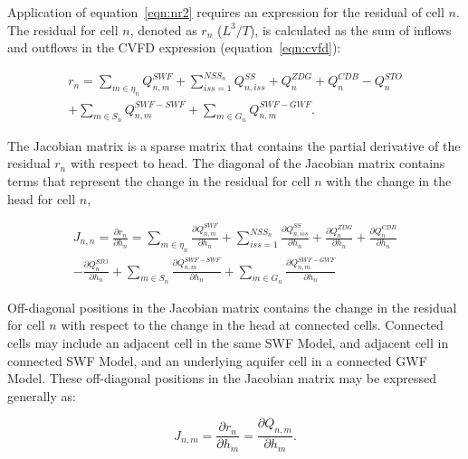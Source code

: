 \documentclass[fleqn]{article}
\begin{document}
Application of equation~\ref{eqn:nr2} requires an expression for the residual of cell $n$.  The residual for cell $n$, denoted as $r_n$ ($L^3/T$), is calculated as the sum of inflows and outflows in the CVFD expression (equation~\ref{eqn:cvfd}):

\begin{equation}
  \label{eqn:residual}
  \begin{split}
  r_n = 
  \sum \limits_{m \in \eta_{n}} Q_{n,m}^{SWF}
  + \sum \limits_{iss=1}^{NSS_n} Q_{n,iss}^{SS}
  + Q_n^{ZDG}
  + Q_n^{CDB}
  - Q_n^{STO} \\
  + \sum \limits_{m \in S_{n}} Q_{n,m}^{SWF-SWF}
  + \sum \limits_{m \in G_{n}} Q_{n,m}^{SWF-GWF}.
  \end{split}
\end{equation}

\noindent The Jacobian matrix is a sparse matrix that contains the partial derivative of the residual $r_n$ with respect to head.  The diagonal of the Jacobian matrix contains terms that represent the change in the residual for cell $n$ with the change in the head for cell $n$, 

\begin{equation}
\label{eqn:drndhn}
\begin{split}
J_{n,n} = 
\frac{\partial r_n}{\partial h_n} =  
\sum \limits_{m \in \eta_{n}} \frac{\partial Q_{n,m}^{SWF}}{\partial h_n}
+ \sum \limits_{iss=1}^{NSS_n} \frac{\partial Q_{n,iss}^{SS}}{\partial h_n}
+ \frac{\partial Q_n^{ZDG}}{\partial h_n}
+ \frac{\partial Q_n^{CDB}}{\partial h_n} \\
- \frac{\partial Q_n^{STO}}{\partial h_n}
+ \sum \limits_{m \in S_{n}} \frac{\partial Q_{n,m}^{SWF-SWF}}{\partial h_n}
+ \sum \limits_{m \in G_{n}} \frac{\partial Q_{n,m}^{SWF-GWF}}{\partial h_n}
\end{split}
\end{equation}

\noindent Off-diagonal positions in the Jacobian matrix contains the change in the residual for cell $n$ with respect to the change in the head at connected cells.  Connected cells may include an adjacent cell in the same SWF Model, and adjacent cell in connected SWF Model, and an underlying aquifer cell in a connected GWF Model.  These off-diagonal positions in the Jacobian matrix may be expressed generally as:

\begin{equation}
\label{eqn:drndhm}
J_{n,m} = \frac{\partial r_n}{\partial h_m} = \frac{\partial Q_{n,m}}{\partial h_m}.
\end{equation}
\end{document}
